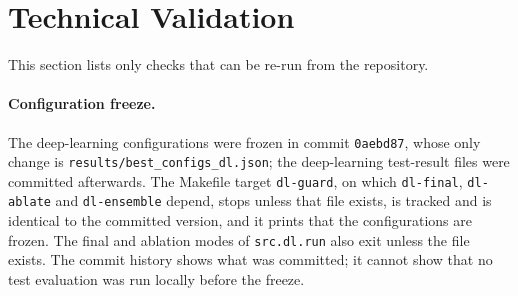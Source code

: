 \section{Technical Validation}
\label{sec:validation}

This section lists only checks that can be re-run from the repository.

\paragraph{Configuration freeze.}
The deep-learning configurations were frozen in commit \texttt{0aebd87}, whose only change is \texttt{results/best\_configs\_dl.json}; the deep-learning test-result files were committed afterwards. The Makefile target \texttt{dl-guard}, on which \texttt{dl-final}, \texttt{dl-ablate} and \texttt{dl-ensemble} depend, stops unless that file exists, is tracked and is identical to the committed version, and it prints that the configurations are frozen. The final and ablation modes of \texttt{src.dl.run} also exit unless the file exists. The commit history shows what was committed; it cannot show that no test evaluation was run locally before the freeze.

